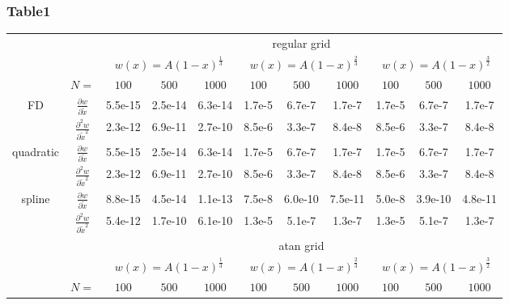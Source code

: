 \subsubsection{Table1}
\begin{tabular}{cc|c|c|c|c|c|c|c|c|c|}
\cline{3-11}
& & \multicolumn{9}{|c|}{regular grid}
\\ \cline{3-11}
& & \multicolumn{3}{|c|}{$w(x)=A(1-x)^\frac{1}{3}$} &  \multicolumn{3}{|c|}{$w(x)=A(1-x)^\frac{2}{3}$} &  \multicolumn{3}{|c|}{$w(x)=A(1-x)^\frac{3}{2}$}
\\ \cline{2-11}
& \multicolumn{1}{|c|}{$N=$} & $100$ & $500$ & $1000$ & $100$ & $500$ & $1000$ & $100$ & $500$ & $1000$
\\ \cline{1-11}
\multicolumn{1}{|c|}{\multirow{2}{*}{FD}} &
\multicolumn{1}{|c|}{$\frac{\partial w}{\partial \tilde x}$}
  &5.5e-15  &2.5e-14  &6.3e-14  &1.7e-5  &6.7e-7  &1.7e-7  &1.7e-5  &6.7e-7  &1.7e-7
\\ \cline{2-11}
\multicolumn{1}{|c|}{}                        &
\multicolumn{1}{|c|}{$\frac{\partial^2 w}{\partial \tilde x^2}$}
  &2.3e-12  &6.9e-11  &2.7e-10  &8.5e-6  &3.3e-7  &8.4e-8  &8.5e-6  &3.3e-7  &8.4e-8
\\ \cline{1-11}
\multicolumn{1}{|c|}{\multirow{2}{*}{quadratic}} &
\multicolumn{1}{|c|}{$\frac{\partial w}{\partial \tilde x}$}
  &5.5e-15  &2.5e-14  &6.3e-14  &1.7e-5  &6.7e-7  &1.7e-7  &1.7e-5  &6.7e-7  &1.7e-7
\\ \cline{2-11}
\multicolumn{1}{|c|}{}                        &
\multicolumn{1}{|c|}{$\frac{\partial^2 w}{\partial \tilde x^2}$}
  &2.3e-12  &6.9e-11  &2.7e-10  &8.5e-6  &3.3e-7  &8.4e-8  &8.5e-6  &3.3e-7  &8.4e-8
\\ \cline{1-11}
\multicolumn{1}{|c|}{\multirow{2}{*}{spline}} &
\multicolumn{1}{|c|}{$\frac{\partial w}{\partial \tilde x}$}
  &8.8e-15  &4.5e-14  &1.1e-13  &7.5e-8  &6.0e-10  &7.5e-11  &5.0e-8  &3.9e-10  &4.8e-11
\\ \cline{2-11}
\multicolumn{1}{|c|}{}                        &
\multicolumn{1}{|c|}{$\frac{\partial^2 w}{\partial \tilde x^2}$}
  &5.4e-12  &1.7e-10  &6.1e-10  &1.3e-5  &5.1e-7  &1.3e-7  &1.3e-5  &5.1e-7  &1.3e-7
\\ \cline{1-11}
& & \multicolumn{9}{|c|}{atan grid}
\\ \cline{3-11}
& & \multicolumn{3}{|c|}{$w(x)=A(1-x)^\frac{1}{3}$} &  \multicolumn{3}{|c|}{$w(x)=A(1-x)^\frac{2}{3}$} &  \multicolumn{3}{|c|}{$w(x)=A(1-x)^\frac{3}{2}$}
\\ \cline{2-11}
& \multicolumn{1}{|c|}{$N=$} & $100$ & $500$ & $1000$ & $100$ & $500$ & $1000$ & $100$ & $500$ & $1000$

\end{tabular}
